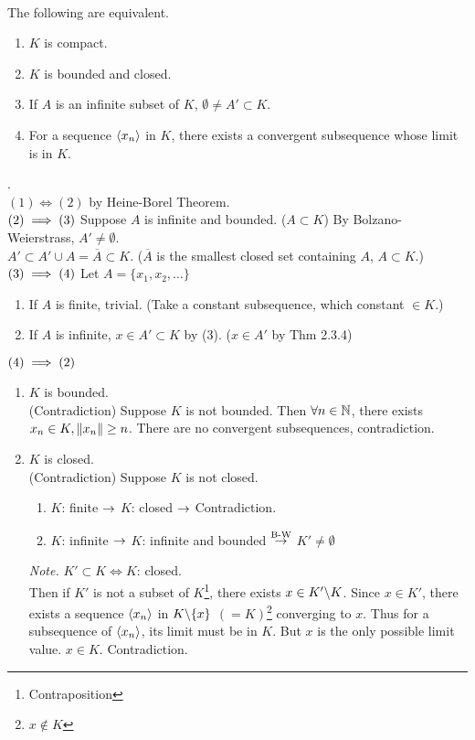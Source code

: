 \pagebreak~\\
 The following are equivalent.
\begin{enumerate}
	\item $K$ is compact.
	\item $K$ is bounded and closed.
	\item If $A$ is an infinite subset of $K$, $\emptyset \neq A'\subset K$.
	\item For a sequence $\left\langle x_n \right\rangle$ in $K$, there exists a convergent subsequence whose limit is in $K$.
\end{enumerate}
\pf. \\
$(1) \iff (2)$ by Heine-Borel Theorem.\\
$(2) \implies (3)$ Suppose $A$ is infinite and bounded. ($A\subset K$) By Bolzano-Weierstrass, $A'\neq \emptyset$.\\
$A'\subset A'\cup A = \overline{A}\subset K$. ($\overline{A}$ is the smallest closed set containing $A$, $A\subset K$.)\\
$(3) \implies (4)$ Let $A = \{x_1, x_2, \dots \}$
\begin{enumerate}
	\item If $A$ is finite, trivial. (Take a constant subsequence, which constant $\in K$.)
	\item If $A$ is infinite, $x\in A'\subset K$ by (3). ($x\in A'$ by Thm 2.3.4)
\end{enumerate}
$(4)\implies (2)$
\begin{enumerate}
	\item $K$ is bounded.\\
	(Contradiction) Suppose $K$ is not bounded. Then $\forall n\in \mathbb{N}$, there exists $x_n\in K, \left\lVert x_n\right\rVert\geq n$. There are no convergent subsequences, contradiction.
	\item $K$ is closed.\\
	(Contradiction) Suppose $K$ is not closed.
	\begin{enumerate}
		\item $K$: finite $\rightarrow$ $K$: closed $\rightarrow$ Contradiction.
		\item $K$: infinite $\rightarrow$ $K$: infinite and bounded $\overset{\text{B-W}}{\rightarrow}$ $K'\neq \emptyset$
	\end{enumerate}
	\textit{Note.} $K'\subset K \iff K$: closed.\\
	Then if $K'$ is not a subset of $K$\footnote{Contraposition}, there exists $x\in K'\backslash K$. Since $x\in K'$, there exists a sequence $\left\langle x_n \right\rangle$ in $K\backslash \{x\}$ $(=K)$\footnote{$x\notin K$} converging to $x$. Thus for a subsequence of $\left\langle x_n \right\rangle$, its limit must be in $K$. But $x$ is the only possible limit value. $x\in K$. Contradiction.
\end{enumerate}

